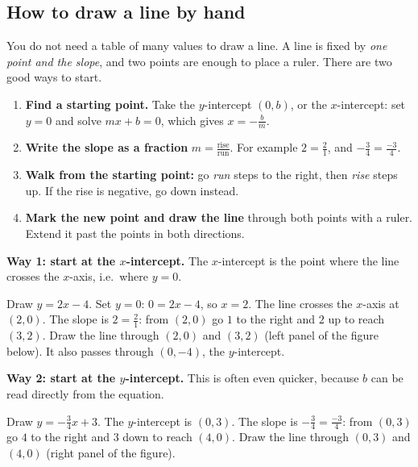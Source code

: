 \subsection*{How to draw a line by hand}
You do not need a table of many values to draw a line. A line is fixed by \emph{one point and the slope}, and two points are enough to place a ruler. There are two good ways to start.

\begin{keyidea}
\begin{enumerate}[nosep,label=\textbf{\arabic*.}]
  \item \textbf{Find a starting point.} Take the $y$-intercept $(0,b)$, or the $x$-intercept: set $y=0$ and solve $mx+b=0$, which gives $x=-\frac{b}{m}$.
  \item \textbf{Write the slope as a fraction} $m=\frac{\text{rise}}{\text{run}}$. For example $2=\frac{2}{1}$, and $-\frac34=\frac{-3}{4}$.
  \item \textbf{Walk from the starting point:} go \emph{run} steps to the right, then \emph{rise} steps up. If the rise is negative, go down instead.
  \item \textbf{Mark the new point and draw the line} through both points with a ruler. Extend it past the points in both directions.
\end{enumerate}
\end{keyidea}

\textbf{Way 1: start at the $x$-intercept.} The $x$-intercept is the point where the line crosses the $x$-axis, i.e.\ where $y=0$.

\begin{example}
Draw $y=2x-4$. Set $y=0$: $0=2x-4$, so $x=2$. The line crosses the $x$-axis at $(2,0)$. The slope is $2=\frac21$: from $(2,0)$ go $1$ to the right and $2$ up to reach $(3,2)$. Draw the line through $(2,0)$ and $(3,2)$ (left panel of the figure below). It also passes through $(0,-4)$, the $y$-intercept.
\end{example}

\textbf{Way 2: start at the $y$-intercept.} This is often even quicker, because $b$ can be read directly from the equation.

\begin{example}
Draw $y=-\frac34x+3$. The $y$-intercept is $(0,3)$. The slope is $-\frac34=\frac{-3}{4}$: from $(0,3)$ go $4$ to the right and $3$ down to reach $(4,0)$. Draw the line through $(0,3)$ and $(4,0)$ (right panel of the figure).
\end{example}

